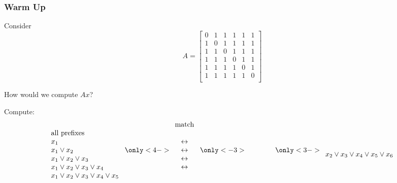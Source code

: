 \documentclass{beamer}
\begin{document}
\begin{frame}
\frametitle{Warm Up}

Consider
\[
 A =\begin{bmatrix}
    0 & 1 & 1 & 1 & 1 & 1 \\
    1 & 0 & 1 & 1 & 1 & 1 \\
    1 & 1 & 0 & 1 & 1 & 1 \\
    1 & 1 & 1 & 0 & 1 & 1 \\
    1 & 1 & 1 & 1 & 0 & 1 \\
    1 & 1 & 1 & 1 & 1 & 0 \\
    \end{bmatrix}
\]

How would we compute $Ax$?

\pause
\medskip
Compute:
\vspace{-3mm}
\begin{equation*}
\begin{array}{l}
\\
\text{all prefixes}\\
x_1\\
x_1 \vee x_2\\
x_1 \vee x_2 \vee x_3\\
x_1 \vee x_2 \vee x_3 \vee x_4\\
x_1 \vee x_2 \vee x_3 \vee x_4 \vee x_5\\
\end{array}\ 
\only<4->{\begin{array}{c}
\text{match}\\
\\
\leftrightarrow\\
\leftrightarrow\\
\leftrightarrow\\
\leftrightarrow\\
\\
\end{array}\ }
\only<-3>{\phantom{\begin{array}{c}
\text{match}\\
\\
\leftrightarrow\\
\leftrightarrow\\
\leftrightarrow\\
\leftrightarrow\\
\\
\end{array}\ }}
\only<3->{\begin{array}{r}
\\
x_2 \vee x_3 \vee x_4 \vee x_5 \vee x_6\\

\end{array}}
\end{equation*}
\end{frame}
\end{document}
